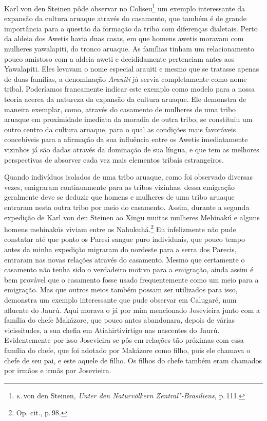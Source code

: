 Karl von den Steinen pôde observar no Coliseu\footnote{\textsc{k}.\,von den
  Steinen, \textit{Unter den Naturvölkern Zentral"-Brasiliens}, p.\,111.} um
exemplo interessante da expansão da cultura aruaque através do
casamento, que também é de grande importância para a questão da formação
da tribo com diferenças dialetais. Perto da aldeia dos Awetis havia duas
casas, em que homens awetis moravam com mulheres yawalapiti, do tronco
aruaque. As famílias tinham um relacionamento pouco amistoso com a
aldeia aweti e decididamente pertenciam antes aos Yawalapiti. Eles
levavam o nome especial arauiti e mesmo que se tratasse apenas de duas
famílias, a denominação \textit{Arauiti} já servia completamente como nome
tribal. Poderíamos francamente indicar este exemplo como modelo para a
nossa teoria acerca da natureza da expansão da cultura aruaque. Ele
demonstra de maneira exemplar, como, através do casamento de mulheres de
uma tribo aruaque em proximidade imediata da moradia de outra tribo, se
constituiu um outro centro da cultura aruaque, para o qual as condições
mais favoráveis concebíveis para a afirmação da sua influência entre os Awetis 
imediatamente vizinhos já são dadas através da dominação
de sua língua, e que tem as melhores perspectivas de absorver cada vez
mais elementos tribais estrangeiros.

Quando indivíduos isolados de uma tribo aruaque, como foi observado
diversas vezes, emigraram continuamente para as tribos vizinhas, dessa
emigração geralmente deve se deduzir que homens e mulheres de uma tribo
aruaque entraram nesta outra tribo por meio do casamento. Assim, durante
a segunda expedição de Karl von den Steinen ao Xingu muitas mulheres
Mehinakú e alguns homens mehinakús viviam entre os Nahukuhá.\footnote{Op.
  cit., p.\,98.} Eu infelizmente não pude constatar até que ponto os
Paresí sangue puro individuais, que pouco tempo antes da minha expedição
migraram do nordeste para a serra dos Parecis, entraram nas novas
relações através do casamento. Mesmo que certamente o casamento não
tenha sido o verdadeiro motivo para a emigração, ainda assim é bem
provável que o casamento fosse usado frequentemente como um meio para a
emigração. Mas que outros meios também possam ser utilizados para isso,
demonstra um exemplo interessante que pude observar em Calugaré, num
afluente do Jaurú. Aqui morava o já por mim mencionado Josevieira junto
com a família do chefe Makázore, que pouco antes abandonara, depois de
várias vicissitudes, a sua chefia em Atiahirtivirtigo nas nascentes do
Jaurú. Evidentemente por isso Josevieira se pôs em relações tão
próximas com essa família do chefe, que foi adotado por Makázore como
filho, pois ele chamava o chefe de seu pai, e este aquele de filho. Os
filhos do chefe também eram chamados por irmãos e irmãs por Josevieira.

